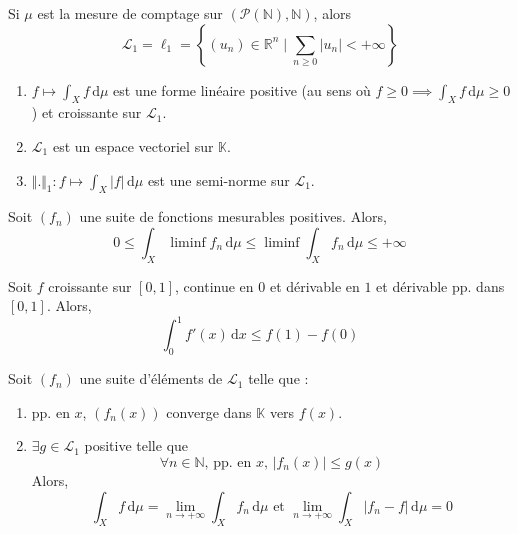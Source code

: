 	\begin{example}
		Si $\mu$ est la mesure de comptage sur $(\mathcal{P}(\mathbb{N}), \mathbb{N})$, alors
		\[ \mathcal{L}_1 = \ell_1 = \left\{ (u_n) \in \mathbb{R}^n \mid \sum_{n \geq 0} \vert u_n \vert < +\infty \right\} \]
	\end{example}

	\begin{theorem}
		\begin{enumerate}[label=(\roman*)]
			\item $f \mapsto \int_X f \, \mathrm{d}\mu$ est une forme linéaire positive (au sens où $f \geq 0 \implies \int_X f \, \mathrm{d}\mu \geq 0$) et croissante sur $\mathcal{L}_1$.
			\item $\mathcal{L}_1$ est un espace vectoriel sur $\mathbb{K}$.
			\item $\Vert . \Vert_1 : f \mapsto \int_X \vert f \vert \, \mathrm{d}\mu$ est une semi-norme sur $\mathcal{L}_1$.
		\end{enumerate}
	\end{theorem}

	\reference{137}

	\begin{theorem}
		Soit $(f_n)$ une suite de fonctions mesurables positives. Alors,
		\[ 0 \leq \int_X \liminf f_n \, \mathrm{d}\mu \leq \liminf \int_X f_n \, \mathrm{d}\mu \leq +\infty \]
	\end{theorem}

	\begin{example}
	  \label{234-2}
		Soit $f$ croissante sur $[0,1]$, continue en $0$ et dérivable en $1$ et dérivable pp. dans $[0,1]$. Alors,
		\[ \int_{0}^{1} f'(x) \, \mathrm{d}x \leq f(1) - f(0) \]
	\end{example}

	\begin{theorem}
		Soit $(f_n)$ une suite d'éléments de $\mathcal{L}_1$ telle que :
		\begin{enumerate}[label=(\roman*)]
			\item pp. en $x$, $(f_n(x))$ converge dans $\mathbb{K}$ vers $f(x)$.
			\item $\exists g \in \mathcal{L}_1$ positive telle que
			\[ \forall n \in \mathbb{N}, \, \text{pp. en } x, \, \vert f_n(x) \vert \leq g(x) \]
			Alors,
			\[ \int_X f \, \mathrm{d}\mu = \lim_{n \rightarrow +\infty} \int_X f_n \, \mathrm{d}\mu \text{ et } \lim_{n \rightarrow +\infty} \int_X \vert f_n - f \vert \, \mathrm{d}\mu = 0 \]
		\end{enumerate}
	\end{theorem}

